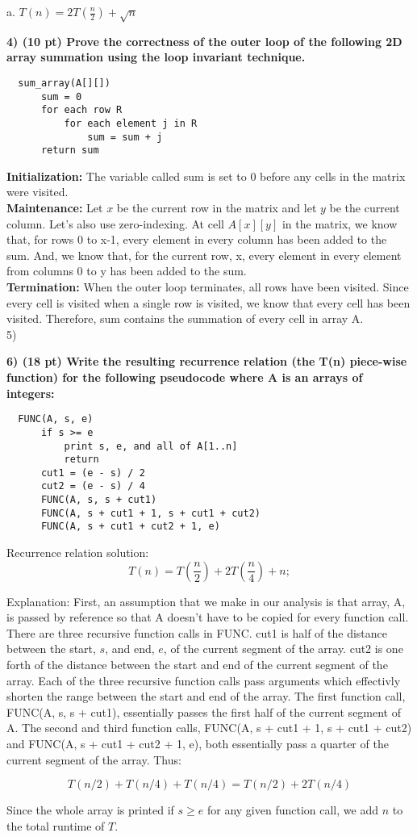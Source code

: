 \documentclass[12pt, a4paper]{article}
\begin{document}
  a. $ T(n) = 2T (\frac{n}{2}) + \sqrt{n} $


\newpage
\textbf{4) (10 pt) Prove the correctness of the outer loop of the following 2D array summation using
the loop invariant technique.}

\begin{lstlisting}
  sum_array(A[][])
      sum = 0
      for each row R
          for each element j in R
              sum = sum + j
      return sum
\end{lstlisting}

\textbf{Initialization:} The variable called sum is set to 0 before any cells in the matrix were visited. \\

\textbf{Maintenance:} Let $x$ be the current row in the matrix and let $y$ be the current column. Let's also use 
zero-indexing. At cell $A[x][y]$ in the matrix, we know that, for rows 0 to x-1, every element in every column
has been added to the sum. And, we know that, for the current row, x, every element in every element from 
columns 0 to y has been added to the sum.  \\

\textbf{Termination:} When the outer loop terminates, all rows have been visited. Since every cell is visited 
when a single row is visited, we know that every cell has been visited. Therefore, sum contains the summation of
every cell in array A. \\

5)

\newpage
\textbf{6) (18 pt) Write the resulting recurrence relation (the T(n) piece-wise function) for the
following pseudocode where A is an arrays of integers: } \\

\begin{lstlisting}
  FUNC(A, s, e)
      if s >= e
          print s, e, and all of A[1..n]
          return
      cut1 = (e - s) / 2
      cut2 = (e - s) / 4
      FUNC(A, s, s + cut1)
      FUNC(A, s + cut1 + 1, s + cut1 + cut2)
      FUNC(A, s + cut1 + cut2 + 1, e)
\end{lstlisting} 

Recurrence relation solution: 
\[
  T(n) = T \left( \frac{n}{2} \right) + 2T \left( \frac{n}{4} \right) + n;
\]

Explanation: First, an assumption that we make in our analysis is that
array, A, is passed by reference so that A doesn't have to be copied 
for every function call. 
There are three recursive function calls in FUNC. 
cut1 is half of the distance between the start, $s$, and end, $e$, of the current segment 
of the array. cut2 is one forth of the distance between the start and end
of the current segment of the array.
Each of the three recursive function calls pass arguments which effectivly shorten the range 
between the start and end of the array.
The first function call, FUNC(A, s, s + cut1), essentially passes the first half of the current
segment of A.  
The second and third function calls, FUNC(A, s + cut1 + 1, s + cut1 + cut2) and 
FUNC(A, s + cut1 + cut2 + 1, e), both essentially pass a quarter of the current segment of 
the array.
Thus: 

\[ 
  T(n/2) + T(n/4) + T(n/4) = T(n/2) + 2T(n/4)
\]

Since the whole array is printed if $ s \geq e $ for any given function call, we add $ n $ to the total runtime 
of $T$.
\end{document}
